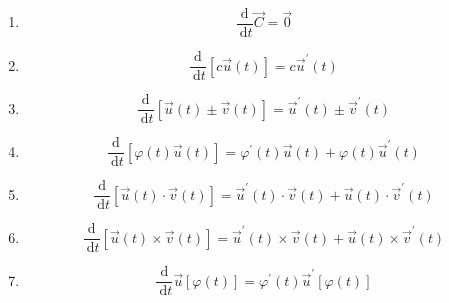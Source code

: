 \documentclass[12pt, a4paper]{article}
\numberwithin{equation}{section}
\begin{document}
    \begin{enumerate}
        \item $$
                \frac{\mathrm{d}}{\mathrm{~d} t} \overrightarrow{C}=\overrightarrow{0}
            $$
        \item $$
                \frac{\mathrm{d}}{\mathrm{~d} t}[c \overrightarrow{u}(t)]=c \overrightarrow{u}^{\prime}(t)
            $$
        \item $$
                \frac{\mathrm{d}}{\mathrm{~d} t}[\overrightarrow{u}(t) \pm \overrightarrow{v}(t)]=\overrightarrow{u}^{\prime}(t) \pm \overrightarrow{v}^{\prime}(t)
            $$
        \item $$
                \frac{\mathrm{d}}{\mathrm{~d} t}[\varphi(t) \overrightarrow{u}(t)]=
                \varphi^{\prime}(t) \overrightarrow{u}(t)+\varphi(t) \overrightarrow{u}^{\prime}(t)
            $$
        \item $$
                \frac{\mathrm{d}}{\mathrm{~d} t}[\overrightarrow{u}(t) \cdot \overrightarrow{v}(t)]=
                \overrightarrow{u}^{\prime}(t) \cdot \overrightarrow{v}(t)+\overrightarrow{u}(t) \cdot \overrightarrow{v}^{\prime}(t)
            $$
        \item $$
                \frac{\mathrm{d}}{\mathrm{~d} t}[\overrightarrow{u}(t) \times \overrightarrow{v}(t)]=
                \overrightarrow{u}^{\prime}(t) \times \overrightarrow{v}(t)+\overrightarrow{u}(t) \times \overrightarrow{v}^{\prime}(t)
            $$
        \item $$
                \frac{\mathrm{d}}{\mathrm{~d} t} \overrightarrow{u}[\varphi(t)]=\varphi^{\prime}(t) \overrightarrow{u}^{\prime}[\varphi(t)]
            $$
    \end{enumerate}
\end{document}
